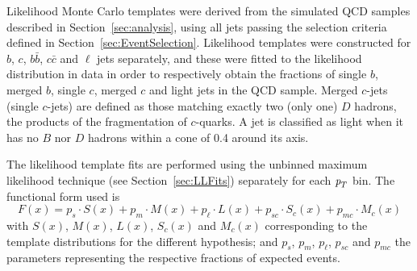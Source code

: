 Likelihood Monte Carlo templates were derived from the simulated QCD samples described in Section~\ref{sec:analysis}, using all jets passing the selection criteria defined in Section~\ref{sec:EventSelection}. Likelihood templates were constructed for $b$, $c$, $b\bar{b}$, $c\bar{c}$ and $\ell$ jets separately, and these were fitted to the likelihood distribution in data in order to respectively obtain the fractions of single $b$, merged $b$, single $c$, merged $c$ and light jets in the QCD sample. Merged $c$-jets (single $c$-jets) are defined as those matching exactly two (only one) $D$ hadrons, the products of the fragmentation of $c$-quarks. A jet is classified as light when it has no $B$ nor $D$ hadrons within a cone of 0.4 around its axis.

The likelihood template fits are performed using the unbinned maximum likelihood technique (see Section~\ref{sec:LLFits}) separately for each ${\emph{p}_{T}}$ bin. The functional form used is
%
\begin{equation}
F(x) = p_s \cdot S(x) + p_m \cdot M(x) + p_\ell \cdot L(x) + p_{sc} \cdot S_c(x) + p_{mc} \cdot M_c(x)
\end{equation}
%
with $S(x)$, $M(x)$, $L(x)$, $S_c(x)$ and $M_c(x)$ corresponding to the template distributions for the different hypothesis; and $p_s$, $p_m$, $p_\ell$, $p_{sc}$ and $p_{mc}$ the parameters representing the respective fractions of expected events. 

